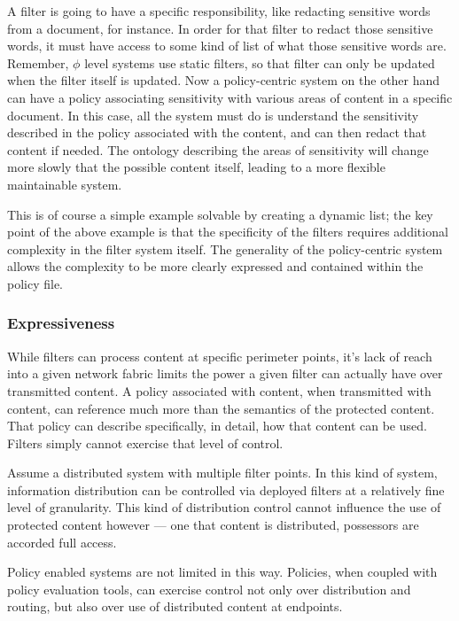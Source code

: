 A filter is going to have a specific responsibility, like redacting sensitive words from a document, for instance.  In order for that filter to redact those sensitive words, it must have access to some kind of list of what those sensitive words are.  Remember, $\phi$ level systems use static filters, so that filter can only be updated when the filter itself is updated.  Now a policy-centric system on the other hand can have a policy associating sensitivity with various areas of content in a specific document.  In this case, all the system must do is understand the sensitivity described in the policy associated with the content, and can then redact that content if needed.  The ontology describing the areas of sensitivity will change more slowly that the possible content itself, leading to a more flexible maintainable system.

This is of course a simple example solvable by creating a dynamic list; the key point of the above example is that the specificity of the filters requires additional complexity in the filter system itself.  The generality of the policy-centric system allows the complexity to be more clearly expressed and contained within the policy file.

\subsubsection*{Expressiveness}
While filters can process content at specific perimeter points, it's lack of reach into a given network fabric limits the power a given filter can actually have over transmitted content.  A policy associated with content, when transmitted with content, can reference much more than the semantics of the protected content.  That policy can describe specifically, in detail, how that content can be used.  Filters simply cannot exercise that level of control.

Assume a distributed system with multiple filter points.  In this kind of system, information distribution can be controlled via deployed filters at a relatively fine level of granularity.  This kind of distribution control cannot influence the use of protected content however --- one that content is distributed, possessors are accorded full access.

Policy enabled systems are not limited in this way.  Policies, when coupled with policy evaluation tools, can exercise control not only over distribution and routing, but also over use of distributed content at endpoints.

